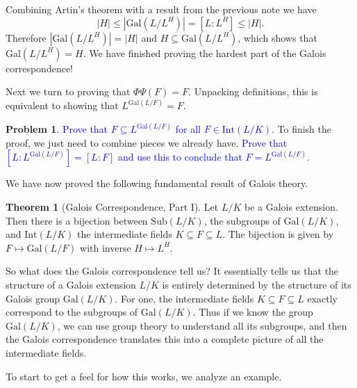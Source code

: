 \documentclass[11pt]{article}
\def\gal{\mathrm{Gal}}
\def\inter{\mathrm{Int}}
\def\sub{\mathrm{Sub}}
\theoremstyle{definition}
\newtheorem{theorem}{Theorem}[section]
\newtheorem{problem}{Problem}[section]
\numberwithin{equation}{subsection}
\newcommand{\blue}[1]{\textcolor{blue}{#1}}
\begin{document}
Combining Artin's theorem with a result from the previous note we have
\[
    |H| \leq |\gal(L/L^H)| = [L : L^H] \leq |H|.
\]
Therefore $|\gal(L/L^H)| = |H|$ and $H \subseteq \gal(L/L^H)$, which shows that $\gal(L/L^H) = H$.
We have finished proving the hardest part of the Galois correspondence!

Next we turn to proving that $\Phi\Psi(F) = F$.
Unpacking definitions, this is equivalent to showing that $L^{\gal(L/F)} = F$.

\begin{problem}
    \blue{Prove that $F \subseteq L^{\gal(L/F)}$ for all $F \in \inter(L/K)$.}
    To finish the proof, we just need to combine pieces we already have.
    \blue{Prove that $[L : L^{\gal(L/F)}] = [L : F]$ and use this to conclude that $F =L^{\gal(L/F)}$.}
\end{problem}

We have now proved the following fundamental result of Galois theory.

\begin{theorem}[Galois Correspondence, Part I]
    Let $L/K$ be a Galois extension.
    Then there is a bijection between $\sub(L/K)$, the subgroups of $\gal(L/K)$, and $\inter(L/K)$ the intermediate fields $K \subseteq F \subseteq L$.
    The bijection is given by $F \mapsto \gal(L/F)$ with inverse $H \mapsto L^H$.
\end{theorem}

So what does the Galois correspondence tell us?
It essentially tells us that the structure of a Galois extension $L/K$ is entirely determined by the structure of its Galois group $\gal(L/K)$.
For one, the intermediate fields $K \subseteq F \subseteq L$ exactly correspond to the subgroups of $\gal(L/K)$.
Thus if we know the group $\gal(L/K)$, we can use group theory to understand all its subgroups, and then the Galois correspondence translates this into a complete picture of all the intermediate fields.

To start to get a feel for how this works, we analyze an example.
\end{document}
